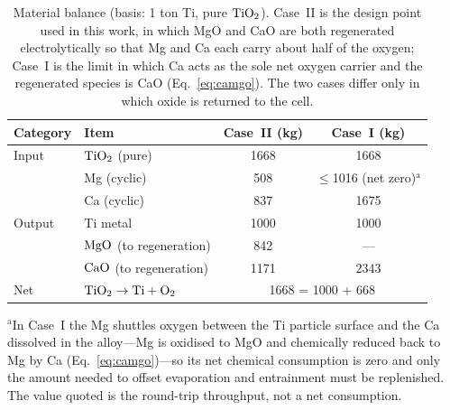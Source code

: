 \documentclass[11pt]{article}
\begin{document}
\begin{table}[!ht]
\centering
\footnotesize
\caption{Material balance (basis: 1 ton Ti, pure $\ce{TiO2}$). Case~II is the design point used in this work, in which MgO and CaO are both regenerated electrolytically so that Mg and Ca each carry about half of the oxygen; Case~I is the limit in which Ca acts as the sole net oxygen carrier and the regenerated species is CaO (Eq.~\ref{eq:camgo}). The two cases differ only in which oxide is returned to the cell.}
\label{tab:mbalance}
\begin{tabular}{llcc}
\toprule
Category & Item & Case~II (kg) & Case~I (kg) \\
\midrule
Input & $\ce{TiO2}$ (pure) & 1668 & 1668 \\
 & Mg (cyclic) & 508 & $\le$1016 (net zero)$^{\mathrm{a}}$ \\
 & Ca (cyclic) & 837 & 1675 \\
\midrule
Output & Ti metal & 1000 & 1000 \\
 & $\ce{MgO}$ (to regeneration) & 842 & --- \\
 & $\ce{CaO}$ (to regeneration) & 1171 & 2343 \\
\midrule
Net & $\ce{TiO2} \to \ce{Ti} + \ce{O2}$ & \multicolumn{2}{c}{1668 = 1000 + 668} \\
\bottomrule
\end{tabular}

\par\footnotesize $^{\mathrm{a}}$In Case~I the Mg shuttles oxygen between the Ti particle surface and the Ca dissolved in the alloy---Mg is oxidised to MgO and chemically reduced back to Mg by Ca (Eq.~\ref{eq:camgo})---so its net chemical consumption is zero and only the amount needed to offset evaporation and entrainment must be replenished. The value quoted is the round-trip throughput, not a net consumption.
\end{table}
\end{document}
